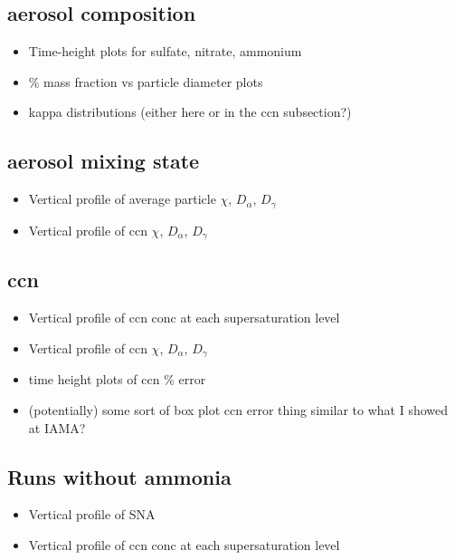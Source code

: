 \subsection{aerosol composition}

\begin{itemize}
\item Time-height plots for sulfate, nitrate, ammonium
\item \% mass fraction vs particle diameter plots
\item kappa distributions (either here or in the ccn subsection?)
\end{itemize}

\subsection{aerosol mixing state}

\begin{itemize}
\item Vertical profile of average particle $\chi$, $D_{\alpha}$, $D_{\gamma}$
\item Vertical profile of ccn $\chi$, $D_{\alpha}$, $D_{\gamma}$
\end{itemize}

\subsection{ccn}

\begin{itemize}
\item Vertical profile of ccn conc at each supersaturation level
\item Vertical profile of ccn $\chi$, $D_{\alpha}$, $D_{\gamma}$
\item time height plots of ccn \% error
\item (potentially) some sort of box plot ccn error thing similar to what I showed at IAMA?
\end{itemize}

\subsection{Runs without ammonia}

\begin{itemize}
\item Vertical profile of SNA
\item Vertical profile of ccn conc at each supersaturation level
\end{itemize}

